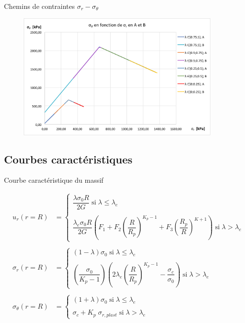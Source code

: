 \documentclass{beamer}
\begin{document}
\begin{frame}{Chemins de contraintes $\sigma_r - \sigma_{\theta}$}
    
\begin{figure}
\centering
\includegraphics[width=10cm]{sig2.png}
\end{figure}

\end{frame}



\subsection{Courbes caractéristiques}

\begin{frame}{Courbe caractéristique du massif}
    
    \begin{align*}
    u_r(r=R)&=\left\{\begin{array}{l}
    \dfrac{\lambda\sigma_0R}{2G}\;\text{si}\;\lambda\leq\lambda_e\\\\
    \dfrac{\lambda_e\sigma_0R}{2G}\left(F_1+F_2\left(\dfrac{R}{R_p}\right)^{K_p-1}+F_3\left(\dfrac{R_p}{R}\right)^{K+1}\right)\;\text{si}\;\lambda>\lambda_e\end{array}\right.\\\\
    \sigma_r(r=R)&=\left\{\begin{array}{l}
    (1-\lambda)\sigma_0\;\text{si}\;\lambda\leq\lambda_e\\\\
    \left(\dfrac{\sigma_0}{K_p-1}\right)\left(2\lambda_e\left(\dfrac{R}{R_p}\right)^{K_p-1}-\dfrac{\sigma_c}{\sigma_0}\right)\;\text{si}\;\lambda>\lambda_e\end{array}\right.\\\\
    \sigma_{\theta}(r=R)&=\left\{\begin{array}{l}
    (1+\lambda)\sigma_0\;\text{si}\;\lambda\leq\lambda_e\\\\
    \sigma_c+K_p\;\sigma_{r,plast}\;\text{si}\;\lambda>\lambda_e\end{array}\right.
    \end{align*}
    
\end{frame}
\end{document}

